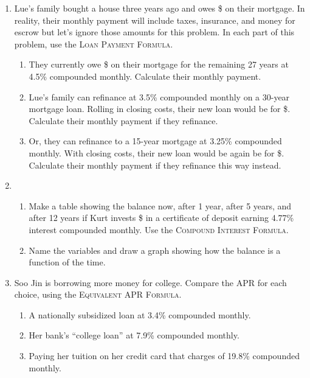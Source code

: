 \begin{enumerate}
\item Lue's family bought a house three years ago and owes \$ on their mortgage.  In reality, their monthly payment will include taxes, insurance, and money for escrow but let's ignore those amounts for this problem. In each part of this problem, use the \textsc{Loan Payment Formula}. 
\begin{enumerate}
\item They currently owe \$ on their mortgage for the remaining 27 years at 4.5\% compounded monthly.  Calculate their monthly payment. 
\item Lue's family can refinance at 3.5\% compounded monthly on a 30-year mortgage loan.  Rolling in closing costs, their new loan would be for \$.  Calculate their monthly payment if they refinance.
\item Or, they can refinance to a 15-year mortgage at 3.25\% compounded monthly.  With closing costs, their new loan would be again be for \$.  Calculate their monthly payment if they refinance this way instead.
\end{enumerate}

\item \begin{enumerate}
\item Make a table showing the balance now, after 1 year, after 5 years, and after 12 years if Kurt invests \$ in a certificate of deposit earning 4.77\% interest compounded monthly. Use the \textsc{Compound Interest Formula}.
\item Name the variables and draw a graph showing how the balance is a function of the time.  
\end{enumerate}

\item Soo Jin is borrowing more money for college. Compare the APR for each choice, using the \textsc{Equivalent APR Formula}.
\begin{enumerate}
\item A nationally subsidized loan at 3.4\% compounded monthly.
\item Her bank's ``college loan'' at 7.9\% compounded monthly.
\item Paying her tuition on her credit card that charges of 19.8\% compounded monthly.
\end{enumerate}

\end{enumerate}
